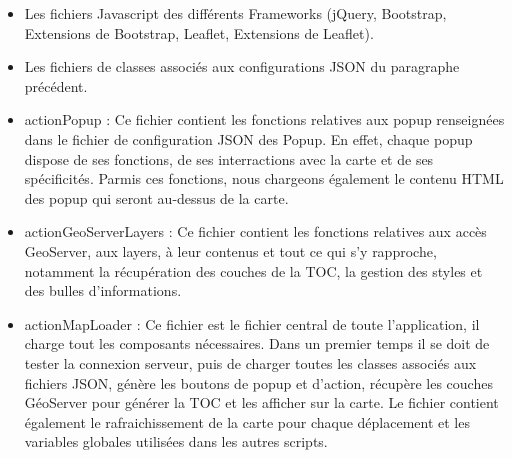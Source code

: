 \begin {itemize}
  \item Les fichiers Javascript des différents Frameworks (jQuery, Bootstrap, Extensions de Bootstrap, Leaflet, Extensions de Leaflet).
  \item Les fichiers de classes associés aux configurations JSON du paragraphe précédent.
  \item actionPopup : Ce fichier contient les fonctions relatives aux popup renseignées dans le fichier de configuration JSON des Popup. En effet, chaque popup dispose de ses fonctions, de ses interractions avec la carte et de ses spécificités. Parmis ces fonctions, nous chargeons également le contenu HTML des popup qui seront au-dessus de la carte.
  \item actionGeoServerLayers : Ce fichier contient les fonctions relatives aux accès GeoServer, aux layers, à leur contenus et tout ce qui s'y rapproche, notamment la récupération des couches de la TOC, la gestion des styles et des bulles d'informations.
  \item actionMapLoader : Ce fichier est le fichier central de toute l'application, il charge tout les composants nécessaires. Dans un premier temps il se doit de tester la connexion serveur, puis de charger toutes les classes associés aux fichiers JSON, génère les boutons de popup et d'action, récupère les couches GéoServer pour générer la TOC et les afficher sur la carte. Le fichier contient également le rafraichissement de la carte pour chaque déplacement et les variables globales utilisées dans les autres scripts.
\end {itemize}


